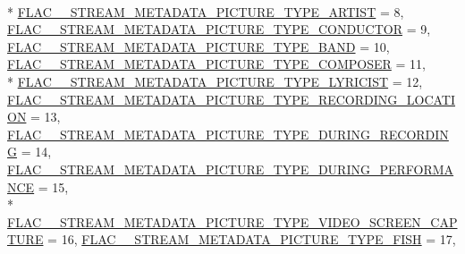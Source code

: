 \begin{DoxyCompactItemize}
\\*
\hyperlink{group__flac__format_ggaf6d3e836cee023e0b8d897f1fdc9825da4cead70f8720f180fc220e6df8d55cce}{F\+L\+A\+C\+\_\+\+\_\+\+S\+T\+R\+E\+A\+M\+\_\+\+M\+E\+T\+A\+D\+A\+T\+A\+\_\+\+P\+I\+C\+T\+U\+R\+E\+\_\+\+T\+Y\+P\+E\+\_\+\+A\+R\+T\+I\+ST} = 8, 
\hyperlink{group__flac__format_ggaf6d3e836cee023e0b8d897f1fdc9825dae01a47af0b0c4d89500b755ebca866ce}{F\+L\+A\+C\+\_\+\+\_\+\+S\+T\+R\+E\+A\+M\+\_\+\+M\+E\+T\+A\+D\+A\+T\+A\+\_\+\+P\+I\+C\+T\+U\+R\+E\+\_\+\+T\+Y\+P\+E\+\_\+\+C\+O\+N\+D\+U\+C\+T\+OR} = 9, 
\hyperlink{group__flac__format_ggaf6d3e836cee023e0b8d897f1fdc9825da8515523b4c9ab65ffef7db98bc09ceb1}{F\+L\+A\+C\+\_\+\+\_\+\+S\+T\+R\+E\+A\+M\+\_\+\+M\+E\+T\+A\+D\+A\+T\+A\+\_\+\+P\+I\+C\+T\+U\+R\+E\+\_\+\+T\+Y\+P\+E\+\_\+\+B\+A\+ND} = 10, 
\hyperlink{group__flac__format_ggaf6d3e836cee023e0b8d897f1fdc9825da5ea1554bc96deb45731bc5897600d1c2}{F\+L\+A\+C\+\_\+\+\_\+\+S\+T\+R\+E\+A\+M\+\_\+\+M\+E\+T\+A\+D\+A\+T\+A\+\_\+\+P\+I\+C\+T\+U\+R\+E\+\_\+\+T\+Y\+P\+E\+\_\+\+C\+O\+M\+P\+O\+S\+ER} = 11, 
\\*
\hyperlink{group__flac__format_ggaf6d3e836cee023e0b8d897f1fdc9825da86159eda8969514f5992b3e341103f22}{F\+L\+A\+C\+\_\+\+\_\+\+S\+T\+R\+E\+A\+M\+\_\+\+M\+E\+T\+A\+D\+A\+T\+A\+\_\+\+P\+I\+C\+T\+U\+R\+E\+\_\+\+T\+Y\+P\+E\+\_\+\+L\+Y\+R\+I\+C\+I\+ST} = 12, 
\hyperlink{group__flac__format_ggaf6d3e836cee023e0b8d897f1fdc9825dac96e810cdd81465709b4a3a03289e89c}{F\+L\+A\+C\+\_\+\+\_\+\+S\+T\+R\+E\+A\+M\+\_\+\+M\+E\+T\+A\+D\+A\+T\+A\+\_\+\+P\+I\+C\+T\+U\+R\+E\+\_\+\+T\+Y\+P\+E\+\_\+\+R\+E\+C\+O\+R\+D\+I\+N\+G\+\_\+\+L\+O\+C\+A\+T\+I\+ON} = 13, 
\hyperlink{group__flac__format_ggaf6d3e836cee023e0b8d897f1fdc9825da8cee3bb376ed1044b3a7e20b9c971ff1}{F\+L\+A\+C\+\_\+\+\_\+\+S\+T\+R\+E\+A\+M\+\_\+\+M\+E\+T\+A\+D\+A\+T\+A\+\_\+\+P\+I\+C\+T\+U\+R\+E\+\_\+\+T\+Y\+P\+E\+\_\+\+D\+U\+R\+I\+N\+G\+\_\+\+R\+E\+C\+O\+R\+D\+I\+NG} = 14, 
\hyperlink{group__flac__format_ggaf6d3e836cee023e0b8d897f1fdc9825da4d4dc6904984370501865988d948de3f}{F\+L\+A\+C\+\_\+\+\_\+\+S\+T\+R\+E\+A\+M\+\_\+\+M\+E\+T\+A\+D\+A\+T\+A\+\_\+\+P\+I\+C\+T\+U\+R\+E\+\_\+\+T\+Y\+P\+E\+\_\+\+D\+U\+R\+I\+N\+G\+\_\+\+P\+E\+R\+F\+O\+R\+M\+A\+N\+CE} = 15, 
\\*
\hyperlink{group__flac__format_ggaf6d3e836cee023e0b8d897f1fdc9825da7adc2b194968b51768721de7bda39df9}{F\+L\+A\+C\+\_\+\+\_\+\+S\+T\+R\+E\+A\+M\+\_\+\+M\+E\+T\+A\+D\+A\+T\+A\+\_\+\+P\+I\+C\+T\+U\+R\+E\+\_\+\+T\+Y\+P\+E\+\_\+\+V\+I\+D\+E\+O\+\_\+\+S\+C\+R\+E\+E\+N\+\_\+\+C\+A\+P\+T\+U\+RE} = 16, 
\hyperlink{group__flac__format_ggaf6d3e836cee023e0b8d897f1fdc9825dabbf0d7c519ae8ba8cec7d1f165f67b0f}{F\+L\+A\+C\+\_\+\+\_\+\+S\+T\+R\+E\+A\+M\+\_\+\+M\+E\+T\+A\+D\+A\+T\+A\+\_\+\+P\+I\+C\+T\+U\+R\+E\+\_\+\+T\+Y\+P\+E\+\_\+\+F\+I\+SH} = 17, 

\end{DoxyCompactItemize}
